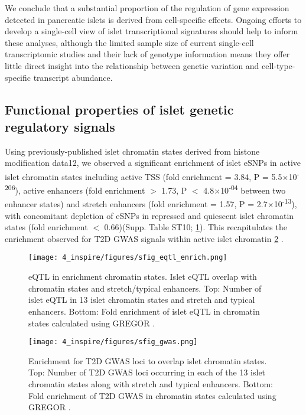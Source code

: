 We conclude that a substantial proportion of the regulation of gene expression detected in pancreatic islets is derived from cell-specific effects. Ongoing efforts to develop a single-cell view of islet transcriptional signatures should help to inform these analyses, although the limited sample size of current single-cell transcriptomic studies \cite{wangSingleCellTranscriptomics2016} and their lack of genotype information means they offer little direct insight into the relationship between genetic variation and cell-type-specific transcript abundance. 

\subsection{Functional properties of islet genetic regulatory signals} 	
Using previously-published islet chromatin states derived from histone modification data12, we observed a significant enrichment of islet eSNPs in active islet chromatin states including active TSS (fold enrichment = 3.84, P = 5.5$\times$10\textsuperscript{-206}), active enhancers (fold enrichment $>$ 1.73, P $<$ 4.8$\times$10\textsuperscript{-04} between two enhancer states) and stretch enhancers (fold enrichment = 1.57, P = 2.7$\times$10\textsuperscript{-13}), with concomitant depletion of eSNPs in repressed and quiescent islet chromatin states (fold enrichment $<$ 0.66)(Supp. Table ST10; \ref{fig:c4_sf_eqtl_enrich}). This recapitulates the enrichment observed for T2D GWAS signals within active islet chromatin \ref{fig:c4_sf_gwas} \cite{parkerChromatinStretchEnhancer2013, pasqualiPancreaticIsletEnhancer2014, varshneyGeneticRegulatorySignatures2017, thurnerIntegrationHumanPancreatic2018}.

\begin{figure}
    \centering
    \texttt{[image: 4\_inspire/figures/sfig\_eqtl\_enrich.png]}
    \caption[eQTL in enrichment islet chromatin states]{eQTL in enrichment chromatin states. Islet eQTL overlap with chromatin states and stretch/typical enhancers. Top: Number of islet eQTL in 13 islet chromatin states and stretch and typical enhancers. Bottom: Fold enrichment of islet eQTL in chromatin states calculated using GREGOR \cite{schmidtGREGOREvaluatingGlobal2015}.}
    \label{fig:c4_sf_eqtl_enrich}
\end{figure}

\begin{figure}
    \centering
    \texttt{[image: 4\_inspire/figures/sfig\_gwas.png]}
    \caption[T2D GWAS enrichment in islet chromatin states.]{Enrichment for T2D GWAS loci to overlap islet chromatin states. Top: Number of T2D GWAS loci occurring in each of the 13 islet chromatin states along with stretch and typical enhancers. Bottom: Fold enrichment of T2D GWAS in chromatin states calculated using GREGOR \cite{schmidtGREGOREvaluatingGlobal2015}.}
    \label{fig:c4_sf_gwas}
\end{figure}
  

